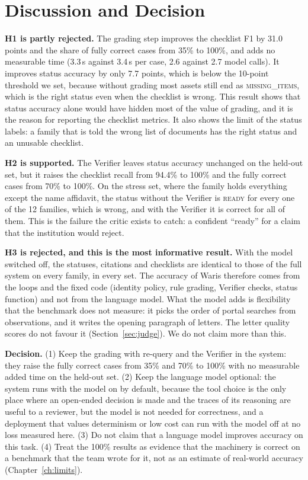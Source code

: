 \section{Discussion and Decision}
\textbf{H1 is partly rejected.} The grading step improves the checklist F1 by 31.0 points and the share of fully correct cases from 35\% to 100\%, and adds no measurable time (3.3\,s against 3.4\,s per case, 2.6 against 2.7 model calls). It improves status accuracy by only 7.7 points, which is below the 10-point threshold we set, because without grading most assets still end as \textsc{missing\_items}, which is the right status even when the checklist is wrong. This result shows that status accuracy alone would have hidden most of the value of grading, and it is the reason for reporting the checklist metrics. It also shows the limit of the status labels: a family that is told the wrong list of documents has the right status and an unusable checklist.

\textbf{H2 is supported.} The Verifier leaves status accuracy unchanged on the held-out set, but it raises the checklist recall from 94.4\% to 100\% and the fully correct cases from 70\% to 100\%. On the stress set, where the family holds everything except the name affidavit, the status without the Verifier is \textsc{ready} for every one of the 12 families, which is wrong, and with the Verifier it is correct for all of them. This is the failure the critic exists to catch: a confident ``ready'' for a claim that the institution would reject.

\textbf{H3 is rejected, and this is the most informative result.} With the model switched off, the statuses, citations and checklists are identical to those of the full system on every family, in every set. The accuracy of Waris therefore comes from the loops and the fixed code (identity policy, rule grading, Verifier checks, status function) and not from the language model. What the model adds is flexibility that the benchmark does not measure: it picks the order of portal searches from observations, and it writes the opening paragraph of letters. The letter quality scores do not favour it (Section~\ref{sec:judge}). We do not claim more than this.

\textbf{Decision.} (1) Keep the grading with re-query and the Verifier in the system: they raise the fully correct cases from 35\% and 70\% to 100\% with no measurable added time on the held-out set. (2) Keep the language model optional: the system runs with the model on by default, because the tool choice is the only place where an open-ended decision is made and the traces of its reasoning are useful to a reviewer, but the model is not needed for correctness, and a deployment that values determinism or low cost can run with the model off at no loss measured here. (3) Do not claim that a language model improves accuracy on this task. (4) Treat the 100\% results as evidence that the machinery is correct on a benchmark that the team wrote for it, not as an estimate of real-world accuracy (Chapter~\ref{ch:limits}).
